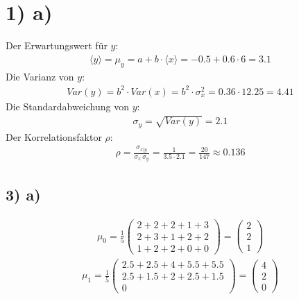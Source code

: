 \section*{1) a)}

Der Erwartungswert für $y$:
\begin{align*}
  \langle y \rangle = \mu_y = a + b\cdot \langle x \rangle = -0.5 + 0.6 \cdot 6 = 3.1
\end{align*}
Die Varianz von $y$:
\begin{align*}
  Var(y) = b^2 \cdot Var(x) = b^2 \cdot \sigma_x^2 = 0.36 \cdot 12.25 = 4.41
\end{align*}
Die Standardabweichung von $y$:
\begin{align*}
  \sigma_y = \sqrt{Var(y)} = 2.1
\end{align*}
Der Korrelationsfaktor $\rho$:
\begin{align*}
  \rho = \frac{\sigma_{x|y}}{\sigma_x\,\sigma_y} = \frac{1}{3.5 \cdot 2.1} = \frac{20}{147} \approx 0.136
\end{align*}









\subsection*{3) a)}

\begin{align*}
  \mu_0 = \frac{1}{5} \begin{pmatrix} 2 +2 +2 +1 +3 \\ 2 +3 +1 +2 +2 \\ 1 +2 +2 +0 +0 \end{pmatrix} = \begin{pmatrix}2 \\ 2 \\ 1 \end{pmatrix}
\end{align*}
\begin{align*}
  \mu_1 = \frac{1}{5} \begin{pmatrix} 2.5 +2.5 +4 +5.5 +5.5 \\ 2.5 +1.5 +2 +2.5 +1.5 \\ 0 \end{pmatrix} = \begin{pmatrix} 4 \\ 2 \\ 0 \end{pmatrix}
\end{align*}

